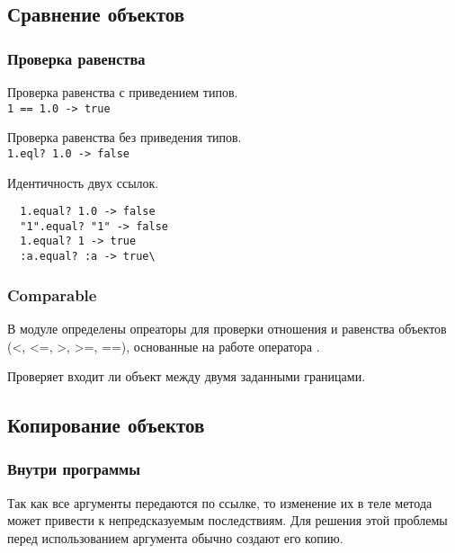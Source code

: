 \subsection{Сравнение объектов}

\subsubsection*{Проверка равенства}

\begin{methodlist}
  \alias{===} 
  Проверка равенства с приведением типов. 
  \\\verb!1 == 1.0 -> true!

  Проверка равенства без приведения типов. 
  \\\verb!1.eql? 1.0 -> false!
 
  Идентичность двух ссылок.
  \begin{verbatim}
  1.equal? 1.0 -> false 
  "1".equal? "1" -> false 
  1.equal? 1 -> true 
  :a.equal? :a -> true\
  \end{verbatim}
\end{methodlist}

\subsubsection*{Comparable}

В модуле определены опреаторы для проверки отношения и равенства объектов (<, <=, >, >=, ==), основанные на работе оператора \method{<=>}.

\begin{methodlist}
  Проверяет входит ли объект между двумя заданными границами.
\end{methodlist}

\subsection{Копирование объектов}

\subsubsection*{Внутри программы}

Так как все аргументы передаются по ссылке, то изменение их в теле метода может привести к непредсказуемым последствиям. Для решения этой проблемы перед использованием аргумента обычно создают его копию.

